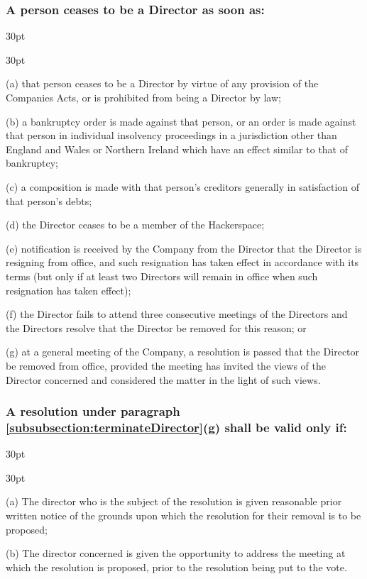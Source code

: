 \documentclass[12pt]{article}
\def\clauseindent{30pt}
\newenvironment{subindentlist}{\begin{adjustwidth}{\clauseindent}{}\begin{labeledlist}{\clauseindent}}{\end{labeledlist}\end{adjustwidth}}
\begin{document}
\subsubsection{\label{subsubsection:terminateDirector}A person ceases to be a Director as soon as:}
\begin{subindentlist}
    \item [(a)] that person ceases to be a Director by virtue of any provision of the Companies Acts, or is prohibited from being a Director by law;
    \item [(b)] a bankruptcy order is made against that person, or an order is made against that person in individual insolvency proceedings in a jurisdiction other than England and Wales or Northern Ireland which have an effect similar to that of bankruptcy;
    \item [(c)] a composition is made with that person’s creditors generally in satisfaction of that person’s debts;
    \item [(d)] the Director ceases to be a member of the Hackerspace;
    \item [(e)] notification is received by the Company from the Director that the Director is resigning from office, and such resignation has taken effect in accordance with its terms (but only if at least two Directors will remain in office when such resignation has taken effect);
    \item [(f)] the Director fails to attend three consecutive meetings of the Directors and the Directors resolve that the Director be removed for this reason; or
    \item [(g)] at a general meeting of the Company, a resolution is passed that the Director be removed from office, provided the meeting has invited the views of the Director concerned and considered the matter in the light of such views.
\end{subindentlist}
\subsubsection{A resolution under paragraph \ref{subsubsection:terminateDirector}(g) shall be valid only if:}
\begin{subindentlist}
    \item [(a)] The director who is the subject of the resolution is given reasonable prior written notice of the grounds upon which the resolution for their removal is to be proposed;
    \item [(b)] The director concerned is given the opportunity to address the meeting at which the resolution is proposed, prior to the resolution being put to the vote.
\end{subindentlist}
\end{document}
